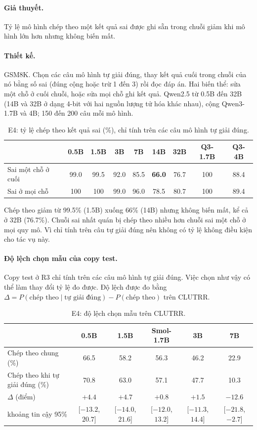 \documentclass[11pt]{article}
\begin{document}
\paragraph{Giả thuyết.} Tỷ lệ mô hình chép theo một kết quả sai được ghi sẵn trong chuỗi giảm khi mô hình
lớn hơn nhưng không biến mất.

\paragraph{Thiết kế.} GSM8K. Chọn các câu mô hình tự giải đúng, thay kết quả cuối trong chuỗi của nó bằng
số sai (đúng cộng hoặc trừ 1 đến 3) rồi đọc đáp án. Hai biến thể: sửa một chỗ ở cuối chuỗi, hoặc sửa mọi
chỗ ghi kết quả. Qwen2.5 từ 0.5B đến 32B (14B và 32B ở dạng 4-bit với hai nguồn lượng tử hóa khác nhau),
cộng Qwen3-1.7B và 4B; 150 đến 200 câu mỗi mô hình.

\begin{table}[h]
\centering\small
\caption{E4: tỷ lệ chép theo kết quả sai (\%), chỉ tính trên các câu mô hình tự giải đúng.}
\setlength{\tabcolsep}{4pt}
\begin{tabular}{lcccccccc}
\toprule
 & 0.5B & 1.5B & 3B & 7B & 14B & 32B & Q3-1.7B & Q3-4B \\
\midrule
Sai một chỗ ở cuối & 99.0 & 99.5 & 92.0 & 85.5 & \textbf{66.0} & 76.7 & 100 & 88.4 \\
Sai ở mọi chỗ & 100 & 100 & 99.0 & 96.0 & 78.5 & 80.7 & 100 & 89.4 \\
\bottomrule
\end{tabular}
\end{table}

Chép theo giảm từ 99.5\% (1.5B) xuống 66\% (14B) nhưng không biến mất, kể cả ở 32B (76.7\%). Chuỗi sai
nhất quán bị chép theo nhiều hơn chuỗi sai một chỗ ở mọi quy mô. Vì chỉ tính trên câu tự giải đúng nên
không có tỷ lệ không điều kiện cho tác vụ này.

\paragraph{Độ lệch chọn mẫu của copy test.} Copy test ở R3 chỉ tính trên các câu mô hình tự giải đúng. Việc
chọn như vậy có thể làm thay đổi tỷ lệ đo được. Độ lệch được đo bằng $\Delta = P(\text{chép theo}\mid
\text{tự giải đúng}) - P(\text{chép theo})$ trên CLUTRR.

\begin{table}[h]
\centering\small
\caption{E4: độ lệch chọn mẫu trên CLUTRR.}
\begin{tabular}{lccccc}
\toprule
 & 0.5B & 1.5B & Smol-1.7B & 3B & 7B \\
\midrule
Chép theo chung (\%) & 66.5 & 58.2 & 56.3 & 46.2 & 22.9 \\
Chép theo khi tự giải đúng (\%) & 70.8 & 63.0 & 57.1 & 47.7 & 10.3 \\
$\Delta$ (điểm) & $+4.4$ & $+4.7$ & $+0.8$ & $+1.5$ & $\mathbf{-12.6}$ \\
\quad khoảng tin cậy 95\% & [$-13.2$, $20.7$] & [$-14.0$, $21.6$] & [$-12.0$, $13.2$] & [$-11.3$, $14.4$] & [$-21.8$, $-2.7$] \\
\bottomrule
\end{tabular}
\end{table}
\end{document}
